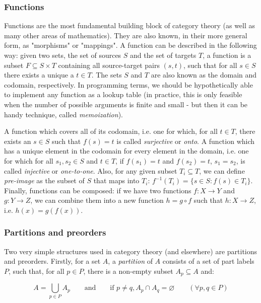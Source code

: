 \documentclass[12pt,a4paper]{article}
\begin{document}
\subsubsection{Functions}

Functions are the most fundamental building block of category theory (as well as many other areas of mathematics). They are also known, in their more general form, as "morphisms" or "mappings". A function can be described in the following way: given two sets, the set of sources $S$ and the set of targets $T$, a function is a subset $F \subseteq S \times T$ containing all source-target pairs $(s, t)$, such that for all $s \in S$ there exists a unique a $t \in T$. The sets $S$ and $T$ are also known as the domain and codomain, respectively. In programming terms, we should be hypothetically able to implement any function as a lookup table (in practice, this is only feasible when the number of possible arguments is finite and small - but then it can be handy technique, called \textit{memoization}).  

A function which covers all of its codomain, i.e. one for which, for all $t \in T$, there exists an $s \in S$ such that $f(s) = t$ is called \textit{surjective} or \textit{onto}. A function which has a unique element in the codomain for every element in the domain, i.e. one for which for all $s_1, s_2 \in S$ and $t \in T$, if $f(s_1) = t$ and $f(s_2) = t$, $s_1 = s_2$, is called \textit{injective} or \textit{one-to-one}. Also, for any given subset $T_i \subseteq T$, we can define \textit{pre-image} as the subset of $S$ that maps into $T_i$: $f^{-1}(T_i) = \{ s \in S : f(s) \in T_i \}$. Finally, functions can be composed: if we have two functions $f: X \to Y$ and $g: Y \to Z$, we can combine them into a new function $h = g \circ f$ such that $h: X \to Z$, i.e. $h(x) = g(f(x))$. 

\subsubsection{Partitions and preorders}

Two very simple structures used in category theory (and elsewhere) are partitions and preorders. Firstly, for a set $A$, a \textit{partition} of $A$ consists of a set of part labels $P$, such that, for all $p \in P$, there is a non-empty subset $A_p \subseteq A$ and:

$$A = \bigcup_{p \in P} A_p \qquad \text{and} \qquad \text{if } p \neq q, A_p \cap A_q = \varnothing \qquad (\forall p, q \in P)$$
\end{document}
